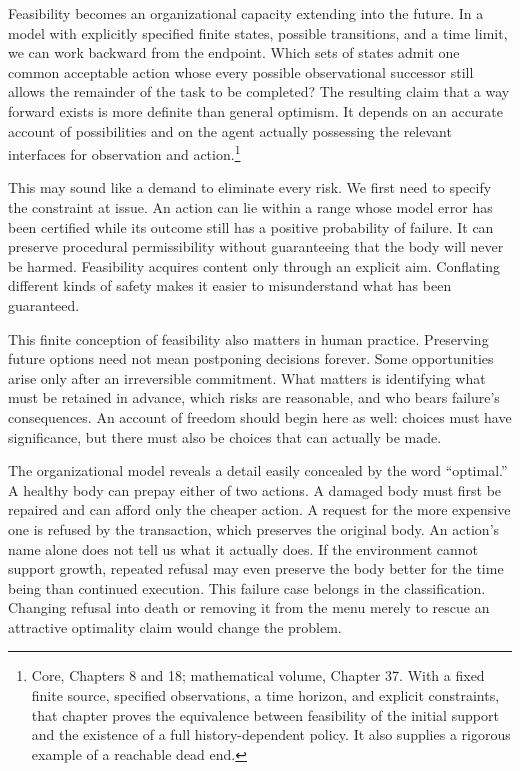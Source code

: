 \documentclass[
  english,
  11pt,
  oneside]{book}
\begin{document}
Feasibility becomes an organizational capacity extending into the future. In a model with explicitly specified finite states, possible transitions, and a time limit, we can work backward from the endpoint. Which sets of states admit one common acceptable action whose every possible observational successor still allows the remainder of the task to be completed? The resulting claim that a way forward exists is more definite than general optimism. It depends on an accurate account of possibilities and on the agent actually possessing the relevant interfaces for observation and action.\footnote{\hypertarget{ph-note-23}{}Core, Chapters 8 and 18; mathematical volume, Chapter 37. With a fixed finite source, specified observations, a time horizon, and explicit constraints, that chapter proves the equivalence between feasibility of the initial support and the existence of a full history-dependent policy. It also supplies a rigorous example of a reachable dead end.}

This may sound like a demand to eliminate every risk. We first need to specify the constraint at issue. An action can lie within a range whose model error has been certified while its outcome still has a positive probability of failure. It can preserve procedural permissibility without guaranteeing that the body will never be harmed. Feasibility acquires content only through an explicit aim. Conflating different kinds of safety makes it easier to misunderstand what has been guaranteed.

This finite conception of feasibility also matters in human practice. Preserving future options need not mean postponing decisions forever. Some opportunities arise only after an irreversible commitment. What matters is identifying what must be retained in advance, which risks are reasonable, and who bears failure's consequences. An account of freedom should begin here as well: choices must have significance, but there must also be choices that can actually be made.

The organizational model reveals a detail easily concealed by the word ``optimal.'' A healthy body can prepay either of two actions. A damaged body must first be repaired and can afford only the cheaper action. A request for the more expensive one is refused by the transaction, which preserves the original body. An action's name alone does not tell us what it actually does. If the environment cannot support growth, repeated refusal may even preserve the body better for the time being than continued execution. This failure case belongs in the classification. Changing refusal into death or removing it from the menu merely to rescue an attractive optimality claim would change the problem.
\end{document}

